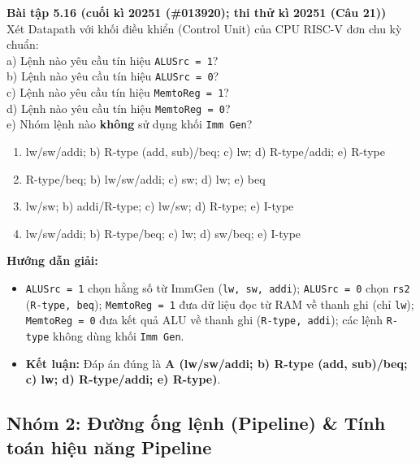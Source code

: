 \textbf{Bài tập 5.16 (cuối kì 20251 (\#013920); thi thử kì 20251 (Câu 21))}\\
Xét Datapath với khối điều khiển (Control Unit) của CPU RISC-V đơn chu kỳ chuẩn:\\
a) Lệnh nào yêu cầu tín hiệu \texttt{ALUSrc = 1}?\\
b) Lệnh nào yêu cầu tín hiệu \texttt{ALUSrc = 0}?\\
c) Lệnh nào yêu cầu tín hiệu \texttt{MemtoReg = 1}?\\
d) Lệnh nào yêu cầu tín hiệu \texttt{MemtoReg = 0}?\\
e) Nhóm lệnh nào \textbf{không} sử dụng khối \texttt{Imm Gen}?
\begin{enumerate}[label=\Alph*.]
    \item lw/sw/addi; b) R-type (add, sub)/beq; c) lw; d) R-type/addi; e) R-type
    \item R-type/beq; b) lw/sw/addi; c) sw; d) lw; e) beq
    \item lw/sw; b) addi/R-type; c) lw/sw; d) R-type; e) I-type
    \item lw/sw/addi; b) R-type/beq; c) lw; d) sw/beq; e) I-type
\end{enumerate}
\textbf{Hướng dẫn giải:}
\begin{itemize}
    \item \texttt{ALUSrc = 1} chọn hằng số từ ImmGen (\texttt{lw, sw, addi}); \texttt{ALUSrc = 0} chọn \texttt{rs2} (\texttt{R-type, beq}); \texttt{MemtoReg = 1} đưa dữ liệu đọc từ RAM về thanh ghi (chỉ \texttt{lw}); \texttt{MemtoReg = 0} đưa kết quả ALU về thanh ghi (\texttt{R-type, addi}); các lệnh \texttt{R-type} không dùng khối \texttt{Imm Gen}.
    \item \textbf{Kết luận:} Đáp án đúng là \textbf{A (lw/sw/addi; b) R-type (add, sub)/beq; c) lw; d) R-type/addi; e) R-type)}.
\end{itemize}


\subsection{Nhóm 2: Đường ống lệnh (Pipeline) \& Tính toán hiệu năng Pipeline}

